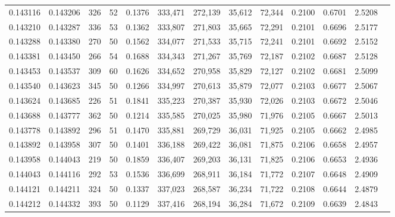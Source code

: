 \begin{tabular}{rrrrrrrrrrrrr}
0.143116 & 0.143206 &   326 &  52 &                                     0.1376 & 333,471 & 272,139 &  35,612 &  72,344 & 0.2100 & 0.6701 & 2.5208 \\
0.143210 & 0.143287 &   336 &  53 &                                     0.1362 & 333,807 & 271,803 &  35,665 &  72,291 & 0.2101 & 0.6696 & 2.5177 \\
0.143288 & 0.143380 &   270 &  50 &                                     0.1562 & 334,077 & 271,533 &  35,715 &  72,241 & 0.2101 & 0.6692 & 2.5152 \\
0.143381 & 0.143450 &   266 &  54 &                                     0.1688 & 334,343 & 271,267 &  35,769 &  72,187 & 0.2102 & 0.6687 & 2.5128 \\
0.143453 & 0.143537 &   309 &  60 &                                     0.1626 & 334,652 & 270,958 &  35,829 &  72,127 & 0.2102 & 0.6681 & 2.5099 \\
0.143540 & 0.143623 &   345 &  50 &                                     0.1266 & 334,997 & 270,613 &  35,879 &  72,077 & 0.2103 & 0.6677 & 2.5067 \\
0.143624 & 0.143685 &   226 &  51 &                                     0.1841 & 335,223 & 270,387 &  35,930 &  72,026 & 0.2103 & 0.6672 & 2.5046 \\
0.143688 & 0.143777 &   362 &  50 &                                     0.1214 & 335,585 & 270,025 &  35,980 &  71,976 & 0.2105 & 0.6667 & 2.5013 \\
0.143778 & 0.143892 &   296 &  51 &                                     0.1470 & 335,881 & 269,729 &  36,031 &  71,925 & 0.2105 & 0.6662 & 2.4985 \\
0.143892 & 0.143958 &   307 &  50 &                                     0.1401 & 336,188 & 269,422 &  36,081 &  71,875 & 0.2106 & 0.6658 & 2.4957 \\
0.143958 & 0.144043 &   219 &  50 &                                     0.1859 & 336,407 & 269,203 &  36,131 &  71,825 & 0.2106 & 0.6653 & 2.4936 \\
0.144043 & 0.144116 &   292 &  53 &                                     0.1536 & 336,699 & 268,911 &  36,184 &  71,772 & 0.2107 & 0.6648 & 2.4909 \\
0.144121 & 0.144211 &   324 &  50 &                                     0.1337 & 337,023 & 268,587 &  36,234 &  71,722 & 0.2108 & 0.6644 & 2.4879 \\
0.144212 & 0.144332 &   393 &  50 &                                     0.1129 & 337,416 & 268,194 &  36,284 &  71,672 & 0.2109 & 0.6639 & 2.4843 \\

\end{tabular}
